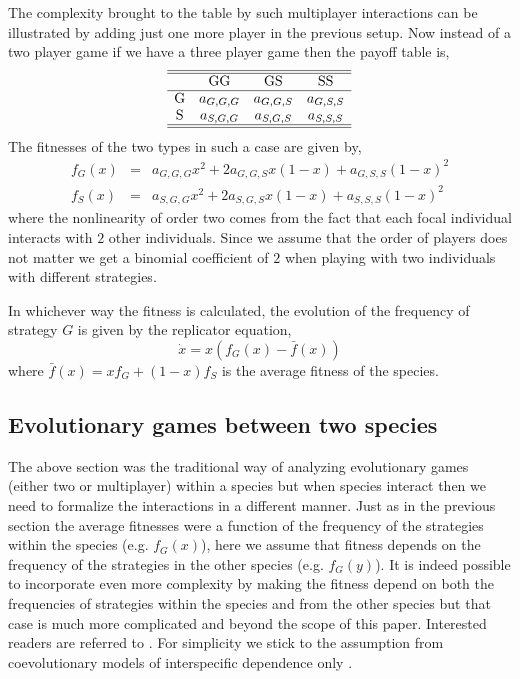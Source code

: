 \documentclass[aps,pre,amsfonts,floatfix, onecolumn,showkeys]{revtex4-1}
\begin{document}
The complexity brought to the table by such multiplayer interactions can be illustrated by adding just one more player in the previous setup.
Now instead of a two player game if we have a three player game then the payoff table is,
%
\begin{equation}\label{eq:threepl}
\begin{array}{cccc}
\hline\hline
 &$GG$	&	$GS$		&	$SS$\\
\hline
$G$ 	& a_{G,G,G} &	a_{G,G,S} &	a_{G,S,S} 
 \\
 $S$ 	&  a_{S,G,G} &a_{S,G,S}  &a_{S,S,S} \nonumber \\
 \hline\hline
\end{array}
\end{equation}
%
The fitnesses of the two types in such a case are given by,
\begin{eqnarray}
f_{G} (x) &=& a_{G,G,G} x^2 + 2 a_{G,G,S} x (1-x) + a_{G,S,S} (1-x)^2 \nonumber \\
f_{S} (x) &=& a_{S,G,G} x^2 + 2 a_{S,G,S} x (1-x) + a_{S,S,S} (1-x)^2 
\end{eqnarray}
where the nonlinearity of order two comes from the fact that each focal individual interacts with $2$ other individuals.
Since we assume that the order of players does not matter we get a binomial coefficient of $2$ when playing with two individuals with different strategies.

In whichever way the fitness is calculated, the evolution of the frequency of strategy $G$ is given by the replicator equation,
\begin{equation}
\dot{x} = x (f_{G} (x) - \bar{f}(x))
\end{equation}
%
where $\bar{f}(x) = x f_{G} + (1-x) f_{S}$ is the average fitness of the species.

\subsection{Evolutionary games between two species}
The above section was the traditional way of analyzing evolutionary games (either two or multiplayer) within a species but when species interact then we need to formalize the interactions in a different manner.
Just as in the previous section the average fitnesses were a function of the frequency of the strategies within the species (e.g. $f_{G}(x)$), here we assume that fitness depends on the frequency of the strategies in the other species (e.g. $f_{G}(y)$).
It is indeed possible to incorporate even more complexity by making the fitness depend on both the frequencies of strategies within the species and from the other species but that case is much more complicated and beyond the scope of this paper. 
Interested readers are referred to \cite{schuster:BC:1981c}.
For simplicity we stick to the assumption from coevolutionary models of interspecific dependence only \cite{roughgarden:TPB:1976,roughgarden:book:1983}.
\end{document}
